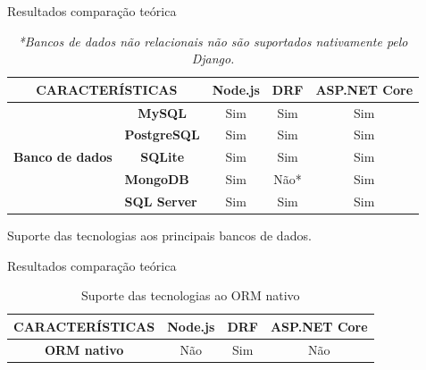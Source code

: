 \documentclass{libs/ufc_format}
\begin{document}
\begin{frame}{Resultados comparação teórica}
    \begin{table}[H]
        \centering
        \begin{tabular}{|cc|c|c|c|}
        \hline
        \multicolumn{2}{|c|}{\textbf{CARACTERÍSTICAS}}                                                            & \textbf{Node.js} & \textbf{DRF} & \textbf{ASP.NET Core} \\ \hline
        \multicolumn{1}{|c|}{\multirow{5}{*}{\textbf{Banco de dados}}} & \textbf{MySQL}                           & Sim              & Sim          & Sim                   \\ \cline{2-5} 
        \multicolumn{1}{|c|}{}                                         & \textbf{PostgreSQL}                      & Sim              & Sim          & Sim                   \\ \cline{2-5} 
        \multicolumn{1}{|c|}{}                                         & \textbf{SQLite}                          & Sim              & Sim          & Sim                   \\ \cline{2-5} 
        \multicolumn{1}{|c|}{}                                         & \multicolumn{1}{l|}{\textbf{MongoDB}}    & Sim              & Não*          & Sim                   \\ \cline{2-5} 
        \multicolumn{1}{|c|}{}                                         & \multicolumn{1}{l|}{\textbf{SQL Server}} & Sim              & Sim          & Sim                   \\ \hline
        \end{tabular}
        \captionsetup{justification=centering}
        \caption{Suporte das tecnologias aos principais bancos de dados.}
        \caption*{\textit{*Bancos de dados não relacionais não são suportados nativamente pelo Django.}}
        \label{tab:resultado-bd}
    \end{table}
\end{frame}

\begin{frame}{Resultados comparação teórica}
    \begin{table}[H]
        \centering
        \begin{tabular}{|c|c|c|c|}
        \hline
        \textbf{CARACTERÍSTICAS} & \textbf{Node.js} & \textbf{DRF} & \textbf{ASP.NET Core} \\ \hline
        \textbf{ORM nativo}      & Não              & Sim          & Não                   \\ \hline
        \end{tabular}
        \captionsetup{justification=centering}
        \caption{Suporte das tecnologias ao ORM nativo}
        \label{tab:resultado-orm}
    \end{table}
\end{frame}
\end{document}
